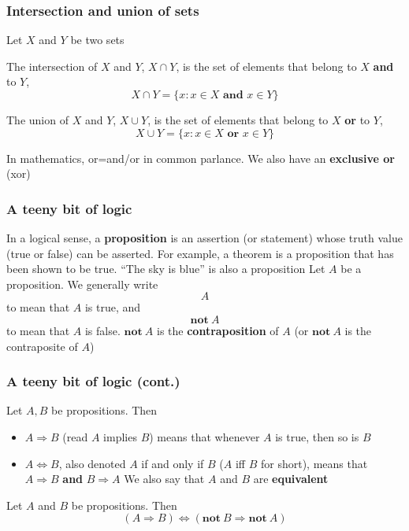 \documentclass[aspectratio=169]{beamer}\usepackage[]{graphicx}\usepackage[]{xcolor}
\begin{document}
\begin{frame}
\frametitle{Intersection and union of sets}
	Let $X$ and $Y$ be two sets
	\vfill
	\begin{definition}[Intersection]
		The intersection of $X$ and $Y$, $X\cap Y$, is the set of elements that belong
		to $X$ \textbf{and} to $Y$,
		\[
		X\cap Y=\{x:x\in X\textbf{ and } x\in Y\}
		\]
	\end{definition}
	\vfill
	\begin{definition}[Union]
		The union of $X$ and $Y$, $X\cup Y$, is the set of elements that belong
		to $X$ \textbf{or} to $Y$,
		\[
		X\cup Y=\{x:x\in X\textbf{ or } x\in Y\}
		\]
	\end{definition}
In mathematics, or=and/or in common parlance. We also have an \textbf{exclusive or} (xor)
\end{frame}

\begin{frame}
\frametitle{A teeny bit of logic}
	In a logical sense, a \textbf{proposition} is an assertion (or statement)
	whose truth value (true or false) can be asserted. For example, a theorem is a
	proposition that has been shown to be true. ``The sky is blue'' is also a
	proposition
	\vfill
	Let $A$ be a proposition. We generally write
	\[
	A
	\]
	to mean that $A$ is true, and 
	\[
	\mathbf{not}\ A
	\]
	to mean that $A$ is false.
	$\mathbf{not}\ A$ is the \textbf{contraposition} of $A$ (or $\mathbf{not}\ A$
	is the contraposite of $A$)
\end{frame}

\begin{frame}
\frametitle{A teeny bit of logic (cont.)}
	Let $A,B$ be propositions. Then
	\begin{itemize}
		\item $A\Rightarrow B$ (read $A$ implies $B$) means that whenever $A$ is true,
		then so is $B$
		\item $A\Leftrightarrow B$, also denoted $A$ if and only if $B$ ($A$
		iff $B$ for short), means that $A\Rightarrow B$ \textbf{and} $B\Rightarrow A$\newline
		We also say that $A$ and $B$ are \textbf{equivalent}
	\end{itemize}
	\vfill
	Let $A$ and $B$ be propositions. Then
	\[
	(A\Rightarrow B)\Leftrightarrow(\mathbf{not}\ B\Rightarrow\mathbf{not}\ A)
	\]
\end{frame}
\end{document}
